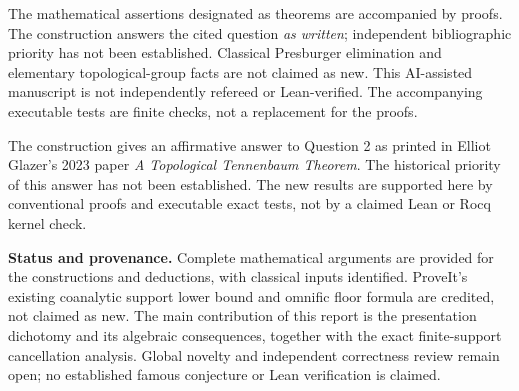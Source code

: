 \documentclass[11pt]{article}
\numberwithin{equation}{section}
\theoremstyle{definition}
\theoremstyle{remark}
\begin{document}
\begin{tcolorbox}[title=Source 05: status and scope]

The mathematical assertions designated as theorems are accompanied by
proofs. The construction answers the cited question \emph{as written};
independent bibliographic priority has not been established. Classical
Presburger elimination and elementary topological-group facts are not
claimed as new. This AI-assisted manuscript is not independently refereed
or Lean-verified. The accompanying executable tests are finite checks, not
a replacement for the proofs.

\end{tcolorbox}
\begin{tcolorbox}[title=Source 04: from its abstract]

The construction gives an affirmative answer to Question 2 as printed in
Elliot Glazer's 2023 paper \emph{A Topological Tennenbaum Theorem}. The
historical priority of this answer has not been established. The new results
are supported here by conventional proofs and executable exact tests, not by
a claimed Lean or Rocq kernel check.

\end{tcolorbox}
\begin{tcolorbox}[title=Source 03: status and provenance]

\small\textbf{Status and provenance.} Complete mathematical arguments are
provided for the constructions and deductions, with classical inputs identified.
ProveIt's existing coanalytic support lower bound and omnific floor formula
are credited, not claimed as new. The main contribution of this report is the
presentation dichotomy and its algebraic consequences, together with the exact
finite-support cancellation analysis. Global novelty and independent correctness
review remain open; no established famous conjecture or Lean verification is
claimed.

\end{tcolorbox}
\end{document}

